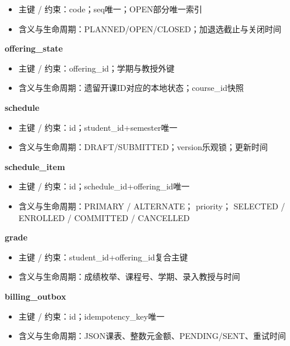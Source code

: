 \documentclass[UTF8,11pt,a4paper]{ctexart}
\providecommand{\tightlist}{\setlength{\itemsep}{0pt}\setlength{\parskip}{0pt}}
\begin{document}
\begin{itemize}
\tightlist
\item
  主键 / 约束：code；seq唯一；OPEN部分唯一索引
\item
  含义与生命周期：PLANNED/OPEN/CLOSED；加退选截止与关闭时间
\end{itemize}

\textbf{offering\_\allowbreak{}state}

\begin{itemize}
\tightlist
\item
  主键 / 约束：offering\_\allowbreak{}id；学期与教授外键
\item
  含义与生命周期：遗留开课ID对应的本地状态；course\_\allowbreak{}id快照
\end{itemize}

\textbf{schedule}

\begin{itemize}
\tightlist
\item
  主键 / 约束：id；student\_\allowbreak{}id+semester唯一
\item
  含义与生命周期：DRAFT/SUBMITTED；version乐观锁；更新时间
\end{itemize}

\textbf{schedule\_\allowbreak{}item}

\begin{itemize}
\tightlist
\item
  主键 / 约束：id；schedule\_\allowbreak{}id+offering\_\allowbreak{}id唯一
\item
  含义与生命周期：PRIMARY / ALTERNATE； priority； SELECTED / ENROLLED / COMMITTED / CANCELLED
\end{itemize}

\textbf{grade}

\begin{itemize}
\tightlist
\item
  主键 / 约束：student\_\allowbreak{}id+offering\_\allowbreak{}id复合主键
\item
  含义与生命周期：成绩枚举、课程号、学期、录入教授与时间
\end{itemize}

\textbf{billing\_\allowbreak{}outbox}

\begin{itemize}
\tightlist
\item
  主键 / 约束：id；idempotency\_\allowbreak{}key唯一
\item
  含义与生命周期：JSON课表、整数元金额、PENDING/SENT、重试时间
\end{itemize}
\end{document}
